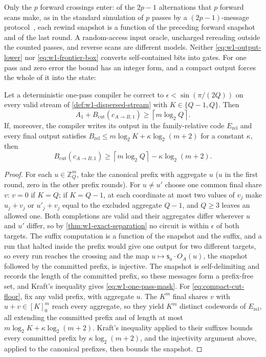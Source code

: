 Only the $p$ forward crossings enter: of the $2p-1$ alternations that $p$
forward scans make, as in the standard simulation of $p$ passes by a
$(2p-1)$-message protocol~\cite{alon1999space,guha2008tight}, each rewind
snapshot is a function of the preceding forward snapshot and of the last
round.  A random-access input oracle, uncharged rereading outside the
counted passes, and reverse scans are different models.  Neither
\eqref{eq:w1-output-lower} nor \eqref{eq:w1-frontier-box} converts
self-contained bits into gates.  For one pass and zero error the bound
has an integer form, and a compact output forces the whole of it into the
state:

\begin{theorem}
\label{thm:w1-one-pass-mask}
\label{thm:main-tradeoff}
Let a deterministic one-pass compiler be correct to
$\epsilon<\sin(\pi/(2Q))$ on every valid stream of
\cref{def:w1-dispersed-stream} with $K\in\{Q-1,Q\}$.  Then
\begin{equation}
 A_1+B_{\mathrm{cut}}(c_{A\to B,1})
 \geq\left\lceil m\log_2Q\right\rceil.
 \label{eq:w1-one-pass-mask}
\end{equation}
If, moreover, the compiler writes its output in the family-relative code
$E_{\mathrm{rel}}$ and every final output satisfies
$B_{\mathrm{rel}}\leq m\log_2K+\kappa\log_2(m+2)$ for a constant
$\kappa$, then
\begin{equation}
 B_{\mathrm{cut}}(c_{A\to B,1})
 \geq\left\lceil m\log_2Q\right\rceil-\kappa\log_2(m+2).
 \label{eq:compact-cut-floor}
\end{equation}
\end{theorem}

\begin{proof}
For each $u\in\mathbb Z_Q^m$, take the canonical prefix with aggregate
$u$ ($u$ in the first round, zero in the other prefix rounds).  For
$u\neq u'$ choose one common final share $v$: $v=0$ if $K=Q$; if $K=Q-1$,
at each coordinate at most two values of $v_j$ make $u_j+v_j$ or
$u'_j+v_j$ equal to the excluded aggregate $Q-1$, and $Q\geq3$ leaves an
allowed one.  Both completions are valid and their aggregates differ
wherever $u$ and $u'$ differ, so by \cref{thm:w1-exact-separation} no
circuit is within $\epsilon$ of both targets.  The suffix computation is
a function of the snapshot and the suffix, and a run that halted inside
the prefix would give one output for two different targets, so every run
reaches the crossing and the map $u\mapsto\mathsf s_u\cdot O_A(u)$, the
snapshot followed by the committed prefix, is injective.  The snapshot is
self-delimiting and records the length of the committed prefix, so these
messages form a prefix-free set, and Kraft's inequality gives
\eqref{eq:w1-one-pass-mask}.  For \eqref{eq:compact-cut-floor}, fix any
valid prefix, with aggregate $u$.  The $K^m$ final shares $v$ with
$u+v\in[K]_0^m$ reach every aggregate, so they yield $K^m$ distinct
codewords of $E_{\mathrm{rel}}$, all extending the committed prefix and of
length at most $m\log_2K+\kappa\log_2(m+2)$.  Kraft's inequality applied
to their suffixes bounds every committed prefix by $\kappa\log_2(m+2)$,
and the injectivity argument above, applied to the canonical prefixes,
then bounds the snapshot.
\end{proof}

